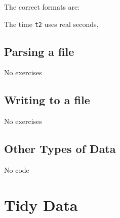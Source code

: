 \documentclass[]{book}
\newenvironment{Shaded}{\begin{snugshade}}{\end{snugshade}}
\newcommand{\CommentTok}[1]{\textcolor[rgb]{0.56,0.35,0.01}{\textit{#1}}}
\newcommand{\KeywordTok}[1]{\textcolor[rgb]{0.13,0.29,0.53}{\textbf{#1}}}
\newcommand{\NormalTok}[1]{#1}
\newcommand{\StringTok}[1]{\textcolor[rgb]{0.31,0.60,0.02}{#1}}
\theoremstyle{plain}
\theoremstyle{remark}
\theoremstyle{definition}
\theoremstyle{definition}
\theoremstyle{definition}
\theoremstyle{remark}
\begin{document}
The correct formats are:

\begin{Shaded}
\end{Shaded}

The time \texttt{t2} uses real seconds,

\begin{Shaded}
\end{Shaded}

\hypertarget{parsing-a-file}{%
\section{Parsing a file}\label{parsing-a-file}}

No exercises

\hypertarget{writing-to-a-file}{%
\section{Writing to a file}\label{writing-to-a-file}}

No exercises

\hypertarget{other-types-of-data}{%
\section{Other Types of Data}\label{other-types-of-data}}

No code

\hypertarget{tidy-data}{%
\chapter{Tidy Data}\label{tidy-data}}
\end{document}

